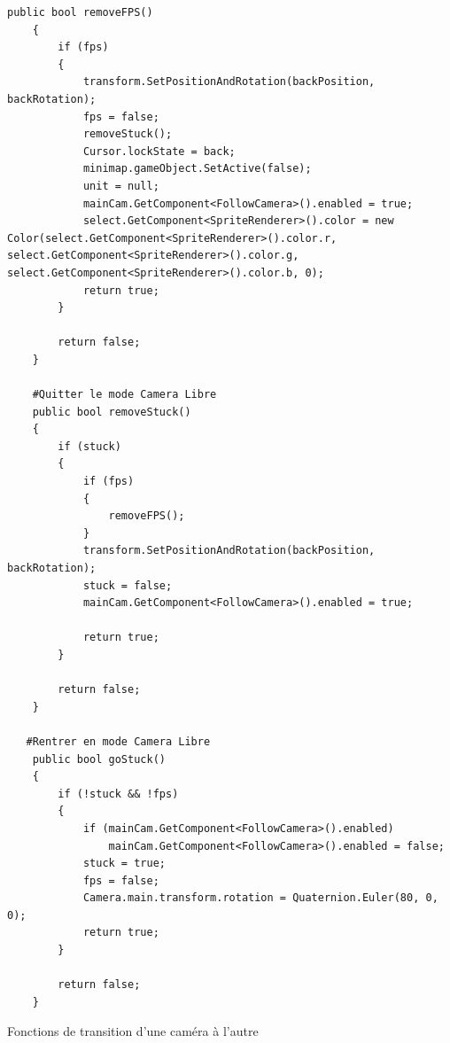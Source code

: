 \documentclass{report}
\begin{document}
\begin{lstlisting}[frame=single]
 public bool removeFPS()
    {
        if (fps)
        {
            transform.SetPositionAndRotation(backPosition, backRotation);
            fps = false;
            removeStuck();
            Cursor.lockState = back;
            minimap.gameObject.SetActive(false);
            unit = null;
            mainCam.GetComponent<FollowCamera>().enabled = true;
            select.GetComponent<SpriteRenderer>().color = new Color(select.GetComponent<SpriteRenderer>().color.r, select.GetComponent<SpriteRenderer>().color.g, select.GetComponent<SpriteRenderer>().color.b, 0);
            return true;
        }

        return false;
    }

    #Quitter le mode Camera Libre
    public bool removeStuck()
    {
        if (stuck)
        {
            if (fps)
            {
                removeFPS();
            }
            transform.SetPositionAndRotation(backPosition, backRotation);
            stuck = false;
            mainCam.GetComponent<FollowCamera>().enabled = true;

            return true;
        }

        return false;
    }

   #Rentrer en mode Camera Libre
    public bool goStuck()
    {
        if (!stuck && !fps)
        {
            if (mainCam.GetComponent<FollowCamera>().enabled)
                mainCam.GetComponent<FollowCamera>().enabled = false;
            stuck = true;
            fps = false;
            Camera.main.transform.rotation = Quaternion.Euler(80, 0, 0);
            return true;
        }

        return false;
    }

\end{lstlisting}
 {Fonctions de transition d’une caméra à l’autre}
\end{document}
